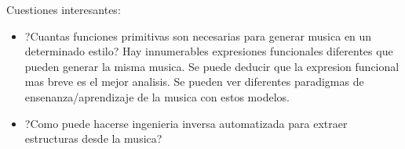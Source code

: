 \documentclass{article}
\begin{document}
{Cuestiones interesantes: 
\begin{itemize}
\item ?Cuantas funciones primitivas son necesarias para generar musica en un determinado estilo? Hay innumerables expresiones funcionales diferentes que pueden generar la misma musica. Se puede deducir que la expresion funcional mas breve es el mejor analisis. Se pueden ver diferentes paradigmas de ensenanza/aprendizaje de la musica con estos modelos.
\item ?Como puede hacerse ingenieria inversa automatizada para extraer estructuras desde la musica?
\end{itemize}

%
%
%
%
%
%
}
\end{document}
